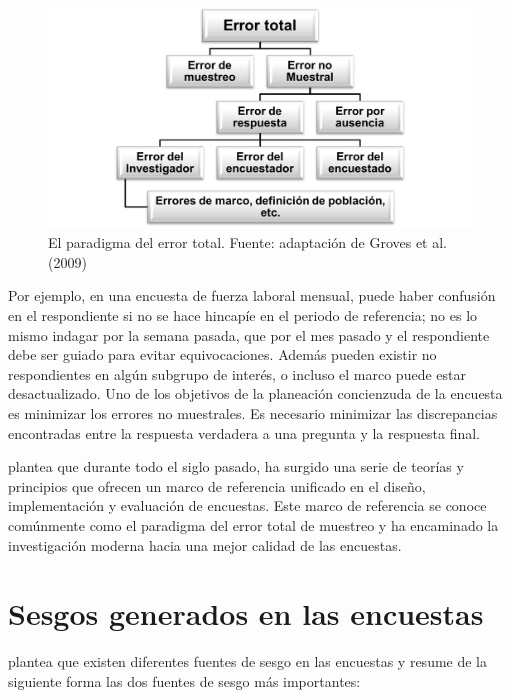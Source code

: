 \documentclass[
  12pt,
]{book}
\begin{document}
\begin{figure}
\includegraphics[width=19.53in]{Pics/Picture9} \caption{El paradigma del error total. Fuente: adaptación de Groves et al. (2009)}\label{fig:errortotal}
\end{figure}

Por ejemplo, en una encuesta de fuerza laboral mensual, puede haber confusión en el respondiente si no se hace hincapíe en el periodo de referencia; no es lo mismo indagar por la semana pasada, que por el mes pasado y el respondiente debe ser guiado para evitar equivocaciones. Además pueden existir no respondientes en algún subgrupo de interés, o incluso el marco puede estar desactualizado. Uno de los objetivos de la planeación concienzuda de la encuesta es minimizar los errores no muestrales. Es necesario minimizar las discrepancias encontradas entre la respuesta verdadera a una pregunta y la respuesta final.

\citet{Groves_Fowler_Couper_Lepkowski_Singer_Tourangeau_2009} plantea que durante todo el siglo pasado, ha surgido una serie de teorías y principios que ofrecen un marco de referencia unificado en el diseño, implementación y evaluación de encuestas. Este marco de referencia se conoce comúnmente como el paradigma del error total de muestreo y ha encaminado la investigación moderna hacia una mejor calidad de las encuestas.

\hypertarget{sesgos-generados-en-las-encuestas}{%
\section{Sesgos generados en las encuestas}\label{sesgos-generados-en-las-encuestas}}

\citet{Gutierrez_2016} plantea que existen diferentes fuentes de sesgo en las encuestas y resume de la siguiente forma las dos fuentes de sesgo más importantes:
\end{document}
